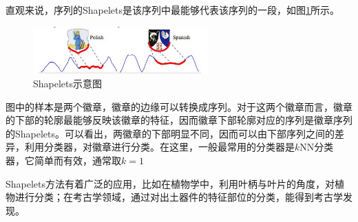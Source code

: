 直观来说，序列的Shapelets是该序列中最能够代表该序列的一段，如图\ref{fig:2}所示。

\begin{figure}
  \centering
  \includegraphics[width=0.6\textwidth]{./figure/shapelets.png}
  \caption{Shapelets示意图}\label{fig:2}
\end{figure}

图中的样本是两个徽章，徽章的边缘可以转换成序列。对于这两个徽章而言，徽章的下部的轮廓最能够反映该徽章的特征，因而徽章下部轮廓对应的序列是徽章序列的Shapelets。可以看出，两徽章的下部明显不同，因而可以由下部序列之间的差异，利用分类器，对徽章进行分类。在这里，一般最常用的分类器是$k$NN分类器，它简单而有效，通常取$k=1$\cite{Xi2006}

Shapelets方法有着广泛的应用，比如在植物学中，利用叶柄与叶片的角度，对植物进行分类；在考古学领域，通过对出土器件的特征部位的分类，能得到考古学发现\cite{anthropology}。
